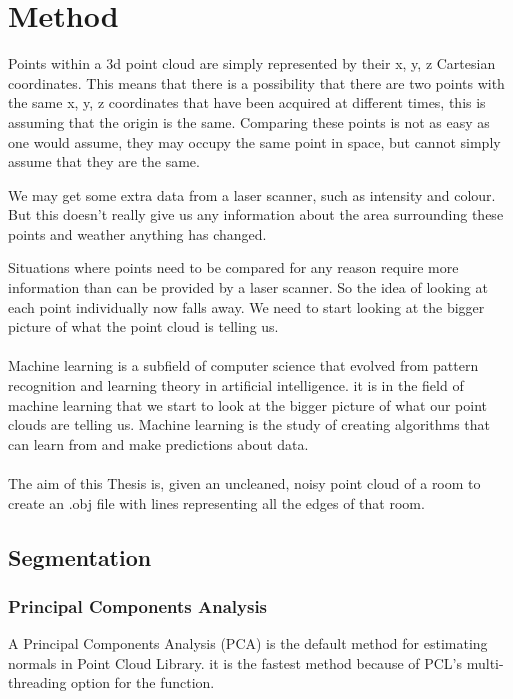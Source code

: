 
\chapter{Method}
	
	Points within a 3d point cloud are simply represented by their x, y, z Cartesian coordinates. This means that there is a possibility that there are two points with the same x, y, z coordinates that have been acquired at different times, this is assuming that the origin is the same. Comparing these points is not as easy as one would assume, they may occupy the same point in space, but cannot simply assume that they are the same.
	
	We may get some extra data from a laser scanner, such as intensity and colour. But this doesn't really give us any information about the area surrounding these points and weather anything has changed.
	
	Situations where points need to be compared for any reason require more information than can be provided by a laser scanner. So the idea of looking at each point individually now falls away. We need to start looking at the bigger picture of what the point cloud is telling us.\\
	\\
	Machine learning is a subfield of computer science that evolved from pattern recognition and learning theory in artificial intelligence. it is in the field of machine learning that we start to look at the bigger picture of what our point clouds are telling us. Machine learning is the study of creating algorithms that can learn from and make predictions about data.\\
	\\
	The aim of this Thesis is, given an uncleaned, noisy point cloud of a room to create an .obj file with lines representing all the edges of that room.
	
	
\section{Segmentation}

	\subsection{Principal Components Analysis}
		A Principal Components Analysis (PCA) is the default method for estimating normals in Point Cloud Library. it is the fastest method because of PCL's multi-threading option for the function.
		

